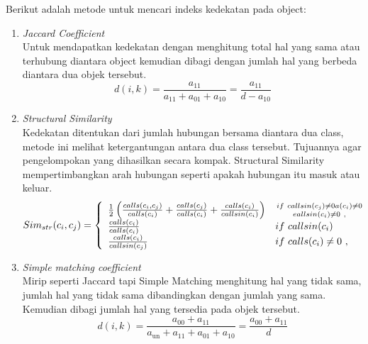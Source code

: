 Berikut adalah metode untuk mencari indeks kedekatan pada object:
\begin{enumerate}[leftmargin=1.3cm]
	\item \textit{Jaccard Coefficient} \cite{2C9} \\
	Untuk mendapatkan kedekatan dengan menghitung total hal yang sama atau terhubung diantara object kemudian dibagi dengan jumlah hal yang berbeda diantara dua objek tersebut. 
	\begin{equation}
		d(i,k)={\frac{a_{11}}{a_{11}+a_{01}+a_{10}}}={\frac{a_{11}}{d-a_{10}}}
	\end{equation}
	\item \textit{Structural Similarity} \cite{ECD}  \\
	Kedekatan ditentukan dari jumlah hubungan bersama diantara dua class, metode ini melihat ketergantungan antara dua class tersebut. Tujuannya agar pengelompokan yang dihasilkan secara kompak. Structural Similarity mempertimbangkan arah hubungan seperti apakah hubungan itu masuk atau keluar.
	\begin{equation}
		S i m_{s t r}(c_{i},c_{j})=\left\{\begin{array}{l l}{{\frac{1}{2}\left(\frac{c a l l s(c_{i},c_{j})}{c a l l s(c_{i})}+\frac{c a l l s(c_{j})}{c a l l s(c_{i})}+\frac{c a l l s(c_{i})}{c a l l s i n(c_{i})}\right)}}&{{i f~c a l l s i n(c_{j})\neq0\nonumber a(c_{i})\neq0\atop e a l l s i n(c_{i})\neq0\ ,}}\\ {{\frac{c a l l s(c_{i})}{c a l l s(c_{i})}}}&{{i f~c a l l s i n(c_{i})}}\\ {{\frac{c a l l s(c_{i})}{c a l l s i n(c_{j})}}}&{{i f~c a l l s(c_{i})\neq0\ ,}}\end{array}\right.
	\end{equation}
	\item \textit{Simple matching coefficient} \cite{2C9} \\
	Mirip seperti Jaccard tapi Simple Matching menghitung hal yang tidak sama, jumlah hal yang tidak sama dibandingkan  dengan jumlah yang sama. Kemudian dibagi jumlah hal yang tersedia pada objek tersebut.
	\begin{equation}
		d(i,k)={\frac{a_{00}+a_{11}}{a_{\mathrm{un}}+a_{11}+a_{01}+a_{10}}}={\frac{a_{00}+a_{11}}{d}}
	\end{equation}
\end{enumerate}	

